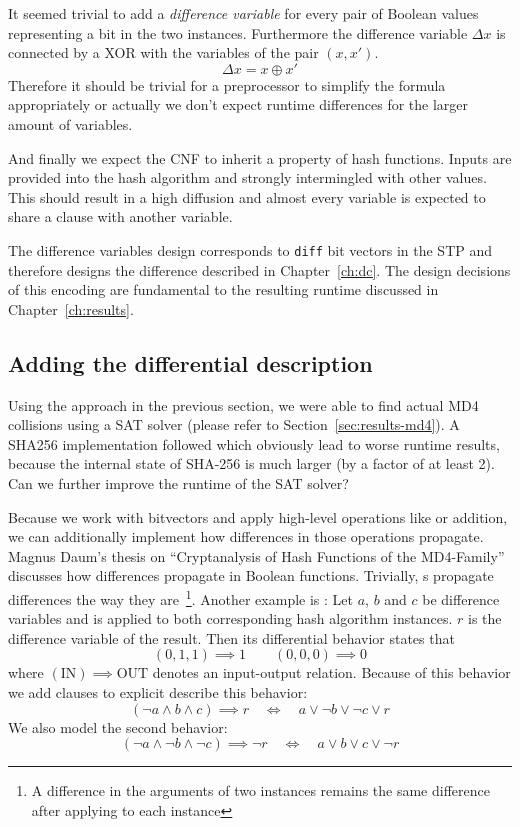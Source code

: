 It seemed trivial to add a \emph{difference variable} for every pair of Boolean
values representing a bit in the two instances. Furthermore the difference
variable $\Delta x$ is connected by a XOR with the variables of the pair $(x, x')$.
\[ \Delta x = x \oplus x' \]
Therefore it should be trivial for a preprocessor to simplify the formula
appropriately or actually we don't expect runtime differences for the larger
amount of variables.

And finally we expect the CNF to inherit a property of hash functions.
Inputs are provided into the hash algorithm and strongly intermingled
with other values. This should result in a high diffusion and almost every
variable is expected to share a clause with another variable.

The difference variables design corresponds to \texttt{diff} bit vectors
in the STP and therefore designs the difference described in Chapter~\ref{ch:dc}.
The design decisions of this encoding are fundamental to the resulting
runtime discussed in Chapter~\ref{ch:results}.

\subsection{Adding the differential description}
\label{sec:enc-diff-desc}
%
Using the approach in the previous section, we were able to find actual MD4 collisions
using a SAT solver (please refer to Section~\ref{sec:results-md4}).
A SHA256 implementation followed which obviously lead to worse
runtime results, because the internal state of SHA-256 is much larger
(by a factor of at least 2). Can we further improve the runtime of the SAT solver?

Because we work with bitvectors and apply high-level operations like  or addition,
we can additionally implement how differences in those operations propagate.
Magnus Daum's thesis on \enquote{Cryptanalysis of Hash Functions of the
MD4-Family}~\cite[Table 4.4]{daum2005cryptanalysis} discusses how differences propagate in
Boolean functions. Trivially, s propagate differences the way they are~\footnote{
A difference in the arguments of two  instances remains the same difference
after applying  to each instance}. Another example is :
Let $a$, $b$ and $c$ be difference variables and  is applied to both corresponding
hash algorithm instances. $r$ is the difference variable of the result.
Then its differential behavior states that
\[ (0, 1, 1) \implies 1 \qquad (0, 0, 0) \implies 0 \]
where $(\text{IN}) \implies \text{OUT}$ denotes an input-output relation.
Because of this behavior we add clauses to explicit describe this behavior:
\[ (\neg a \land b \land c) \implies r \quad \iff \quad a \lor \neg b \lor \neg c \lor r \]
We also model the second behavior:
\[ (\neg a \land \neg b \land \neg c) \implies \neg r \quad \iff \quad a \lor b \lor c \lor \neg r \]

